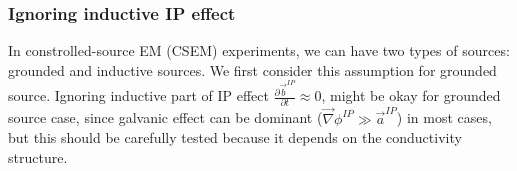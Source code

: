 \documentclass[a4paper, 11pt]{article}
\newcommand{\grad}{\vec \nabla}
\renewcommand {\b}  { {\vec b} }
\begin{document}
\bigskip
{}

\subsubsection{Ignoring inductive IP effect}

In constrolled-source EM (CSEM) experiments, we can have two types of sources: grounded and inductive sources. We first consider this assumption for grounded source. Ignoring inductive part of IP effect $\frac{\partial \b^{IP}}{\partial t}\approx 0$, might be okay for grounded source case, since galvanic effect  can be dominant ($\grad\phi^{IP} \gg \vec{a}^{IP}$) in most cases, but this should be carefully tested because it depends on the conductivity structure. 
\end{document}

